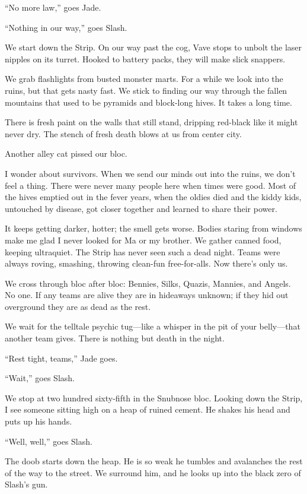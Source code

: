 ``No more law,'' goes Jade.

``Nothing in our way,'' goes Slash.

We start down the Strip. On our way past the cog, Vave stops to unbolt the laser nipples on its turret. Hooked to battery packs, they will make slick snappers.

We grab flashlights from busted monster marts. For a while we look into the ruins, but that gets nasty fast. We stick to finding our way through the fallen mountains that used to be pyramids and block-long hives. It takes a long time.

There is fresh paint on the walls that still stand, dripping red-black like it might never dry. The stench of fresh death blows at us from center city.

Another alley cat pissed our bloc.

I wonder about survivors. When we send our minds out into the ruins, we don't feel a thing. There were never many people here when times were good. Most of the hives emptied out in the fever years, when the oldies died and the kiddy kids, untouched by disease, got closer together and learned to share their power.

It keeps getting darker, hotter; the smell gets worse. Bodies staring from windows make me glad I never looked for Ma or my brother. We gather canned food, keeping ultraquiet. The Strip has never seen such a dead night. Teams were always roving, smashing, throwing clean-fun free-for-alls. Now there's only us.

We cross through bloc after bloc: Bennies, Silks, Quazis, Mannies, and Angels. No one. If any teams are alive they are in hideaways unknown; if they hid out overground they are as dead as the rest.

We wait for the telltale psychic tug—like a whisper in the pit of your belly—that another team gives. There is nothing but death in the night.

``Rest tight, teams,'' Jade goes.

``Wait,'' goes Slash.

We stop at two hundred sixty-fifth in the Snubnose bloc. Looking down the Strip, I see someone sitting high on a heap of ruined cement. He shakes his head and puts up his hands.

``Well, well,'' goes Slash.

The doob starts down the heap. He is so weak he tumbles and avalanches the rest of the way to the street. We surround him, and he looks up into the black zero of Slash's gun.

